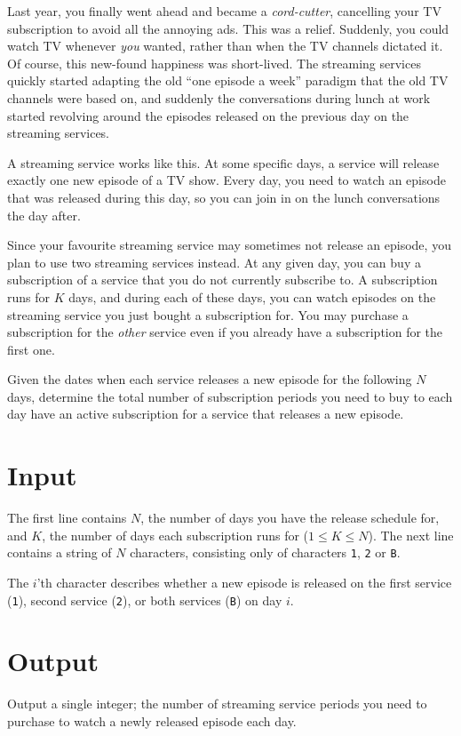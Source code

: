 
Last year, you finally went ahead and became a \emph{cord-cutter}, cancelling your TV subscription to avoid all the annoying ads.
This was a relief.
Suddenly, you could watch TV whenever \emph{you} wanted, rather than when the TV channels dictated it.
Of course, this new-found happiness was short-lived.
The streaming services quickly started adapting the old ``one episode a week'' paradigm that the old TV channels were based on, and suddenly the conversations during lunch at work started revolving around the episodes released on the previous day on the streaming services.

A streaming service works like this.
At some specific days, a service will release exactly one new episode of a TV show.
Every day, you need to watch an episode that was released during this day, so you can join in on the lunch conversations the day after.

Since your favourite streaming service may sometimes not release an episode, you plan to use two streaming services instead.
At any given day, you can buy a subscription of a service that you do not currently subscribe to.
A subscription runs for $K$ days, and during each of these days, you can watch episodes on the streaming service you just bought a subscription for.
You may purchase a subscription for the \emph{other} service even if you already have a subscription for the first one.

Given the dates when each service releases a new episode for the following $N$ days, determine the total number of subscription periods you need to buy to each day have an active subscription for a service that releases a new episode.

\section*{Input}
The first line contains $N$, the number of days you have the release schedule for, and $K$, the number of days each subscription runs for ($1 \le K \le N$).
The next line contains a string of $N$ characters, consisting only of characters \texttt{1}, \texttt{2} or \texttt{B}.

The $i$'th character describes whether a new episode is released on the first service (\texttt{1}), second service (\texttt{2}), or both services (\texttt{B}) on day $i$.

\section*{Output}
Output a single integer; the number of streaming service periods you need to purchase to watch a newly released episode each day.

